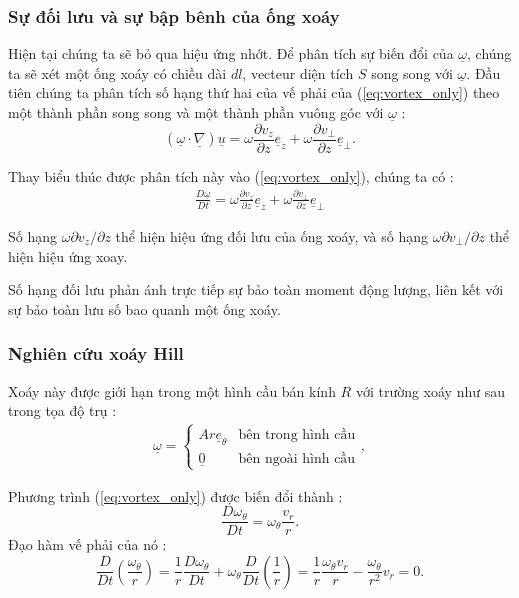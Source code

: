 \documentclass[THUY_DONG_HOC.tex]{subfiles}
\begin{document}
\subsubsection{Sự đối lưu và sự bập bênh của ống xoáy}
Hiện tại chúng ta sẽ bỏ qua hiệu ứng nhớt. Để phân tích sự biến đổi của $\underline{\omega}$, chúng ta sẽ xét một ống xoáy có chiều dài $dl$, vecteur diện tích $S$ song song với $\underline{\omega}$. Đầu tiên chúng ta phân tích số hạng thứ hai của vế phải của (\ref{eq:vortex_only}) theo một thành phần song song và một thành phần vuông góc với $\underline{\omega}$ :
$$
\left( {\underline \omega   \cdot \underline {\nabla} } \right)\underline u=\omega\frac{\partial v_z}{\partial z}\underline{e}_z+\omega\frac{\partial v_\bot}{\partial z}\underline{e}_\bot.
$$

Thay biểu thúc được phân tích này vào (\ref{eq:vortex_only}), chúng ta có :
\begin{equation}\label{eq:vortex_only}
	\begin{aligned}
		\frac{{D\underline \omega  }}{{Dt}}= \omega\frac{\partial v_z}{\partial z}\underline{e}_z+\omega\frac{\partial v_\bot}{\partial z}\underline{e}_\bot
	\end{aligned}
\end{equation}

Số hạng $\omega{\partial v_z}/{\partial z}$ thể hiện hiệu ứng đối lưu của ống xoáy, và số hạng $\omega{\partial v_\bot}/{\partial z}$ thể hiện hiệu ứng xoay.

Số hạng đối lưu phản ánh trực tiếp sự bảo toàn moment động lượng, liên kết với sự bảo toàn lưu số bao quanh một ống xoáy.

\subsubsection{Nghiên cứu xoáy Hill}
Xoáy này được giới hạn trong một hình cầu bán kính $R$ với trường xoáy như sau trong tọa độ trụ :
\begin{equation}
	\begin{aligned}
		\underline{\omega}=\begin{cases}
				Ar\underline{e}_\theta & \text{bên trong hình cầu}\\
				\underline{0} & \text{bên ngoài hình cầu}
			\end{cases},
	\end{aligned}
\end{equation}

Phương trình (\ref{eq:vortex_only}) được biến đổi thành :
$$
\frac{D\omega_\theta}{Dt}=\omega_\theta\frac{v_r}{r}.
$$
Đạo hàm vế phải của nó :
$$
\frac{D}{Dt}\left(\frac{\omega_\theta}{r}\right)=\frac{1}{r}\frac{D\omega_\theta}{Dt}+\omega_\theta\frac{D}{Dt}\left(\frac{1}{r}\right)=\frac{1}{r}\frac{\omega_\theta v_r}{r}-\frac{\omega_\theta}{r^2}v_r=0.
$$
\end{document}
